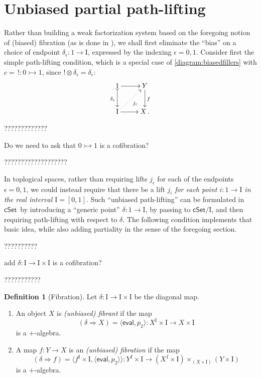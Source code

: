 \documentclass[11pt]{article}
\newcommand{\cSet}{\ensuremath{\mathsf{cSet}}}
\newcommand{\mono}{\ensuremath{\rightarrowtail}}
\newcommand{\I}{\ensuremath{\mathrm{I}}}
\theoremstyle{remark}
\theoremstyle{definition}
\newtheorem{definition}[theorem]{Definition}
\begin{document}
\section{Unbiased partial path-lifting}


Rather than building a weak factorization system based on the foregoing notion of (biased) fibration (as is done in \cite{GG,OP}), we shall first eliminate the ``bias'' on a choice of endpoint $\delta_\epsilon : 1 \to \I$, expressed by the indexing $\epsilon = 0,1$.  Consider first the simple path-lifting condition, which is a special case of \eqref{diagram:biasedfillers} with $c =\, ! : 0\mono 1$, since $!\otimes\delta_\epsilon = \delta_\epsilon$:
\begin{equation*}
\xymatrix{
1 \ar@{>->}[d]_{\delta_\epsilon} \ar[r] & Y \ar[d]^f \\
\I \ar@{.>}[ru]_{j_\epsilon} \ar[r] & X\,.
}
\end{equation*}

?????????????

Do we need to ask that $0\mono 1$ is a cofibration?

???????????????????


In toplogical spaces, rather than requiring lifts $j_\epsilon$ for each of the endpoints $\epsilon = 0,1$, we could instead require that there be a lift $j_i$ \emph{for each point $i: 1\to\I$ in the real interval $\I = [0,1]$}. Such ``unbiased path-lifting'' can be formulated in \cSet\ by introducing a ``generic point'' $\delta : 1\to \I$, by passing to $\cSet/\I$, and then requiring path-lifting with respect to $\delta$.  The following condition implements that basic idea, while also adding partiality in the sense of the foregoing section.

??????????

add $\delta : \I\to\I\times\I$ is a cofibration?

???????????

\begin{definition}[Fibration] Let $\delta : \I\to\I\times\I$ be the diagonal map.
\begin{enumerate}
\item An object $X$ is \emph{(unbiased) fibrant} if the map 
\[
(\delta\Rightarrow\! X) = \langle\mathsf{eval}, p_2\rangle : X^\I \times \I \to X\times \I
\]
is a $+$-algebra. 
\item A map $f : Y\to X$ is an \emph{(unbiased) fibration} if the map 
\[
(\delta\Rightarrow\! f) = \langle f^\I\times \I, \langle \mathsf{eval},p_2 \rangle\rangle: Y^I\times \I \to (X^I \times \I)\times_{(X\times \I)} (Y\times\I)
\]
is a $+$-algebra.
\end{enumerate}
\end{definition}
\end{document}
